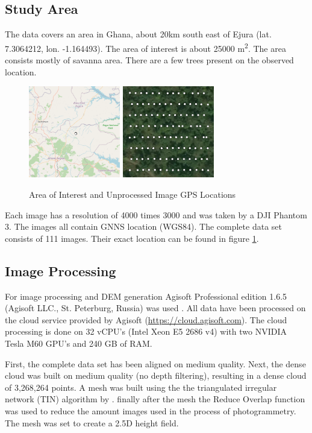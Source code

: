 \documentclass{isprs} %
\begin{document}
\subsection{Study Area}\label{sec:Study Area}
The data covers an area in Ghana, about 20km south east of Ejura (lat. 7.3064212, lon. -1.164493). 
The area of interest is about 25000 m\textsuperscript{2}. 
The area consists mostly of savanna area.
There are a few trees present on the observed location.
\begin{figure}[h]
    \centering
    \includegraphics[width=4cm]{locationwide.png}
    \includegraphics[width=4cm]{imgloc.png}
    \caption{Area of Interest and Unprocessed Image GPS Locations}
    \label{fig:areaofinterest}
\end{figure}
Each image has a resolution of 4000 times 3000 and was taken by a DJI Phantom 3.
The images all contain GNNS location (WGS84). 
The complete data set consists of 111 images.
Their exact location can be found in figure \ref{fig:areaofinterest}.


\subsection{Image Processing}
For image processing and DEM generation Agisoft Professional edition 1.6.5 (Agisoft LLC., St. Peterburg, Russia) was used \citep{AgisoftMetashape}.
All data have been processed on the cloud service provided by Agisoft (\url{https://cloud.agisoft.com}).
The cloud processing is done on 32 vCPU's (Intel Xeon E5 2686 v4) with two NVIDIA Tesla M60 GPU's and 240 GB of RAM.

First, the complete data set has been aligned on medium quality.
Next, the dense cloud was built on medium quality (no depth filtering), resulting in a dense cloud of 3,268,264 points.
A mesh was built using the the triangulated irregular network (TIN) algorithm by \citet{axelsson1999processing}. 
finally after the mesh the Reduce Overlap function was used to reduce the amount images used in the process of photogrammetry. 
The mesh was set to create a 2.5D height field.
\end{document}
